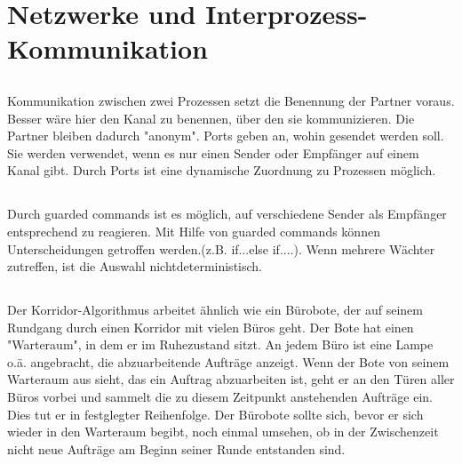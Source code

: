 \section{Netzwerke und Interprozess-Kommunikation}

\subsection{}
\begin{answer}
Kommunikation zwischen zwei Prozessen setzt die Benennung der Partner voraus. Besser wäre hier den Kanal zu benennen, über den sie kommunizieren. Die Partner bleiben dadurch "anonym".
Ports geben an, wohin gesendet werden soll. Sie werden verwendet, wenn es nur einen Sender
oder Empfänger auf einem Kanal gibt. Durch Ports ist eine dynamische Zuordnung zu Prozessen
möglich.
\end{answer}

\subsection{}
\begin{answer}
Durch guarded commands ist es möglich, auf verschiedene Sender als Empfänger entsprechend
zu reagieren. Mit Hilfe von guarded commands können Unterscheidungen getroffen werden.(z.B.
if...else if....).
Wenn mehrere Wächter zutreffen, ist die Auswahl nichtdeterministisch.
\end{answer}

\subsection{}
\begin{answer}
Der Korridor-Algorithmus arbeitet ähnlich wie ein Bürobote, der auf seinem Rundgang durch einen
Korridor mit vielen Büros geht. Der Bote hat einen "Warteraum", in dem er im Ruhezustand sitzt.
An jedem Büro ist eine Lampe o.ä. angebracht, die abzuarbeitende Aufträge anzeigt.
Wenn der Bote von seinem Warteraum aus sieht, das ein Auftrag abzuarbeiten ist, geht er an den
Türen aller Büros vorbei und sammelt die zu diesem Zeitpunkt anstehenden Aufträge ein. Dies
tut er in festglegter Reihenfolge. Der Bürobote sollte sich, bevor er sich wieder in den Warteraum
begibt, noch einmal umsehen, ob in der Zwischenzeit nicht neue Aufträge am Beginn seiner Runde
entstanden sind.
\end{answer}

